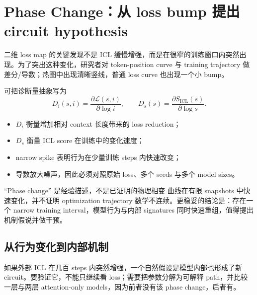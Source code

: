 \section{Phase Change：从 loss bump 提出 circuit hypothesis}

二维 loss map 的关键发现不是 ICL 缓慢增强，而是在很窄的训练窗口内突然出现。为了突出这种变化，研究者对 token-position curve 与 training trajectory 做差分/导数；热图中出现清晰竖线，普通 loss curve 也出现一个小 bump。


可把诊断量抽象写为
\[
D_i(s,i)=\frac{\partial \mathcal{L}(s,i)}{\partial \log i},
\qquad
D_s(s)=\frac{\partial S_{\mathrm{ICL}}(s)}{\partial \log s}.
\]

\begin{itemize}
  \item $D_i$ 衡量增加相对 context 长度带来的 loss reduction；
  \item $D_s$ 衡量 ICL score 在训练中的变化速度；
  \item narrow spike 表明行为在少量训练 steps 内快速改变；
  \item 导数放大噪声，因此必须对照原始 loss、多个 seeds 与多个 model sizes。
\end{itemize}


\begin{warningbox}{“Phase change” 是经验描述，不是已证明的物理相变}
曲线在有限 snapshots 中快速变化，并不证明 optimization trajectory 数学不连续。更稳妥的结论是：存在一个 narrow training interval，模型行为与内部 signatures 同时快速重组，值得提出机制假说并做干预。
\end{warningbox}

\subsection{从行为变化到内部机制}

如果外部 ICL 在几百 steps 内突然增强，一个自然假设是模型内部也形成了新 circuit。要验证它，不能只继续看 loss；需要把参数分解为可解释 path，并比较一层与两层 attention-only models，因为前者没有该 phase change，后者有。


